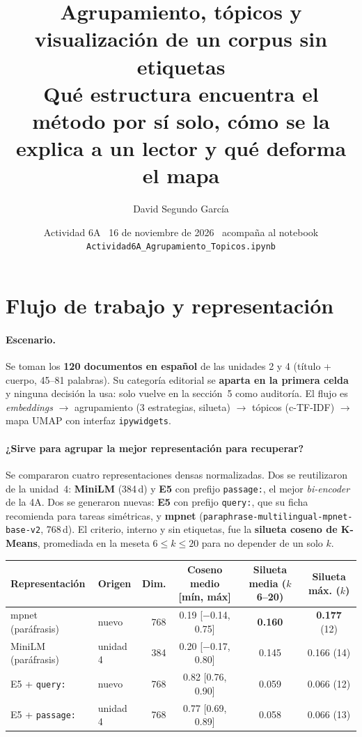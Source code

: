 \documentclass[10pt,a4paper]{article}
\title{\vspace{-1.5cm}\textbf{Agrupamiento, tópicos y visualización de un corpus sin etiquetas}\\[2pt]
\large Qué estructura encuentra el método por sí solo, cómo se la explica a un lector y qué deforma el mapa}
\author{David Segundo García}
\date{\vspace{-0.3cm}Actividad 6A \textperiodcentered\ 16 de noviembre de 2026
\textperiodcentered\ acompaña al notebook \texttt{Actividad6A\_Agrupamiento\_Topicos.ipynb}}
\begin{document}
\maketitle
\vspace{-0.95cm}

\section{Flujo de trabajo y representación}

\paragraph{Escenario.} Se toman los \textbf{120 documentos en español} de las unidades 2 y 4 (título + cuerpo,
45--81 palabras). Su categoría editorial se \textbf{aparta en la primera celda} y ninguna decisión la usa:
solo vuelve en la sección~5 como auditoría. El flujo es
\emph{embeddings} $\rightarrow$ agrupamiento (3 estrategias, silueta) $\rightarrow$ tópicos (c-TF-IDF)
$\rightarrow$ mapa UMAP con interfaz \texttt{ipywidgets}.

\paragraph{¿Sirve para agrupar la mejor representación para recuperar?} Se compararon cuatro representaciones
densas normalizadas. Dos se reutilizaron de la unidad~4: \textbf{MiniLM} (384\,d) y \textbf{E5} con prefijo
\texttt{passage:}, el mejor \emph{bi-encoder} de la 4A. Dos se generaron nuevas: \textbf{E5} con prefijo
\texttt{query:}, que su ficha recomienda para tareas simétricas, y \textbf{mpnet}
(\texttt{paraphrase-multilingual-mpnet-base-v2}, 768\,d). El criterio, interno y sin etiquetas, fue la
\textbf{silueta coseno de K-Means}, promediada en la meseta $6\le k\le 20$ para no depender de un solo $k$.

\begin{table}[H]
\centering\footnotesize\setlength{\tabcolsep}{5pt}
\begin{tabular}{@{}llrccc@{}}
\toprule
\textbf{Representación} & \textbf{Origen} & \textbf{Dim.} & \textbf{Coseno medio [mín, máx]} & \textbf{Silueta media ($k$ 6--20)} & \textbf{Silueta máx. ($k$)} \\
\midrule
mpnet (paráfrasis)        & nuevo     & 768 & 0.19 [$-$0.14, 0.75] & \textbf{0.160} & \textbf{0.177} (12) \\
MiniLM (paráfrasis)       & unidad 4  & 384 & 0.20 [$-$0.17, 0.80] & 0.145 & 0.166 (14) \\
E5 + \texttt{query:}      & nuevo     & 768 & 0.82 [0.76, 0.90]    & 0.059 & 0.066 (12) \\
E5 + \texttt{passage:}    & unidad 4  & 768 & 0.77 [0.69, 0.89]    & 0.058 & 0.066 (13) \\
\bottomrule
\end{tabular}
\end{table}
\end{document}
